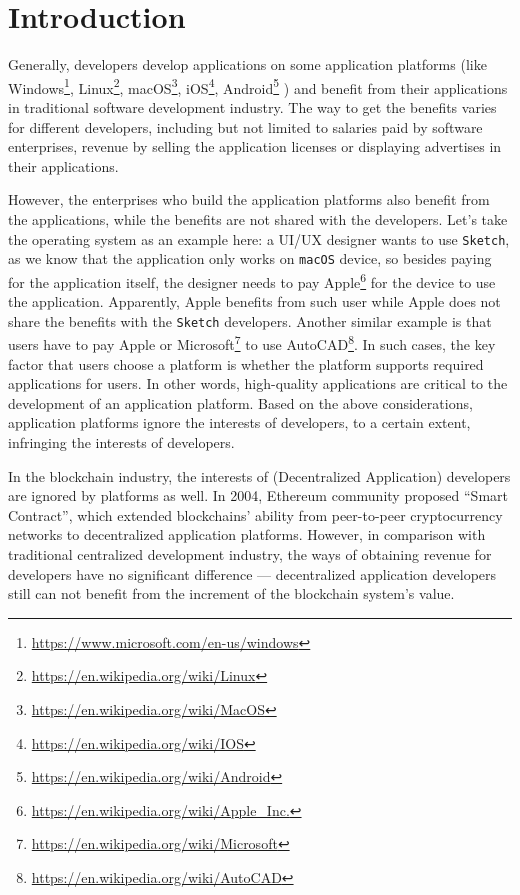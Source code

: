 \section{Introduction}

Generally, developers develop applications on some application platforms (like
Windows\footnote{\url{https://www.microsoft.com/en-us/windows}}, Linux\footnote{\url{https://en.wikipedia.org/wiki/Linux}},
macOS\footnote{\url{https://en.wikipedia.org/wiki/MacOS}},
iOS\footnote{\url{https://en.wikipedia.org/wiki/IOS}},
Android\footnote{\url{https://en.wikipedia.org/wiki/Android}} \etc) and
benefit from their applications in traditional software development industry.
The way to get the benefits varies for different developers, including but not
limited to salaries paid by software enterprises, revenue by selling the
application licenses or displaying advertises in their applications.

However, the enterprises who build the application platforms also benefit
from the applications, while the benefits are not shared with the developers.
Let's take the operating system as an example here: a UI/UX designer wants to use \texttt{Sketch},
as we know that the application only works on \texttt{macOS} device, so besides
paying for the application itself, the designer needs to pay Apple\footnote{\url{https://en.wikipedia.org/wiki/Apple_Inc.}}
for the device  to use the application. Apparently, Apple benefits from such user while
Apple does not share the benefits with the \texttt{Sketch} developers.
Another similar example is that users have to pay Apple or
Microsoft\footnote{\url{https://en.wikipedia.org/wiki/Microsoft}} to use
AutoCAD\footnote{\url{https://en.wikipedia.org/wiki/AutoCAD}}. In such cases,
the key factor that users choose a platform is whether the platform
supports required applications for users. In other words, high-quality
applications are critical to the development of an application platform. Based on the above considerations,  application platforms ignore the interests of developers, to a certain extent, infringing the interests of developers.

In the blockchain industry, the interests of \dapp(Decentralized Application) developers are ignored by platforms  as  well.
 In 2004, Ethereum community proposed ``Smart Contract'',
which extended blockchains' ability from peer-to-peer
cryptocurrency networks to decentralized application platforms. However, in comparison with traditional centralized development industry, the ways of obtaining revenue for developers have no significant difference --- decentralized application developers still can not benefit
 from the increment of the blockchain system's value.


